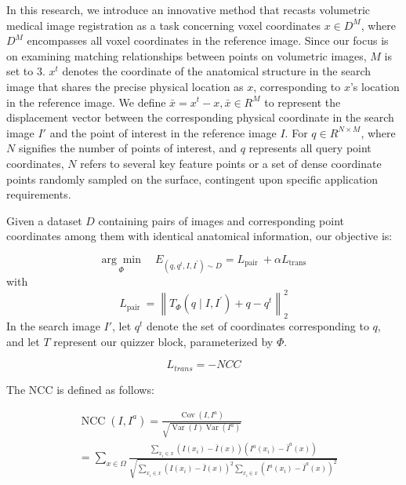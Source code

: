 \documentclass[preprint,review,12pt]{elsarticle}
\begin{document}
In this research, we introduce an innovative method that recasts volumetric medical image registration as a task concerning voxel coordinates $x \in D^{M}$, where $D^{M}$ encompasses all voxel coordinates in the reference image. Since our focus is on examining matching relationships between points on volumetric images, $M$ is set to $3$. $x^{t}$ denotes the coordinate of the anatomical structure in the search image that shares the precise physical location as $x$, corresponding to $x$'s location in the reference image. We define $\bar{x}=x^{t}-x, \bar{x} \in R^{M}$ to represent the displacement vector between the corresponding physical coordinate in the search image $I'$ and the point of interest in the reference image $I$. For $q \in R^{N \times M}$, where $N$ signifies the number of points of interest, and $q$ represents all query point coordinates, $N$ refers to several key feature points or a set of dense coordinate points randomly sampled on the surface, contingent upon specific application requirements.

Given a dataset $D$ containing pairs of images and corresponding point coordinates among them with identical anatomical information, our objective is:

\begin{equation}
\underset{\Phi}{\arg \min } \quad E_{\left(q, q^t, I, I^{\prime}\right) \sim D}=L_{\text {pair }}+\alpha L_{\text {trans }}
\end{equation}
with
\begin{equation}
L_{\text {pair }}=\left\|T_{\Phi}\left(q \mid I, I^{\prime}\right)+q-q^t\right\|_2^2
\end{equation}
In the search image $I'$, let $q^t$ denote the set of coordinates corresponding to $q$, and let $T$ represent our quizzer block, parameterized by $\Phi$.

\begin{equation}
L_{t r a n s}=-N C C
\end{equation}

The NCC is defined as follows:

\begin{equation}
\begin{aligned}
& \operatorname{NCC}\left(I, I^a\right)=\frac{\operatorname{Cov}\left(I, I^a\right)}{\sqrt{\operatorname{Var}(I) \operatorname{Var}\left(I^a\right)}} \\
& =\sum_{x \in \Omega} \frac{\sum_{x_i \in x}\left(I\left(x_i\right)-\bar{I}(x)\right)\left(I^a\left(x_i\right)-\bar{I}^a(x)\right)}{\sqrt{\sum_{x_i \in x}\left(I\left(x_i\right)-\bar{I}(x)\right)^2 \sum_{x_i \in x}\left(I^a\left(x_i\right)-\bar{I}^a(x)\right)^2}}
\end{aligned}
\end{equation}
\end{document}
